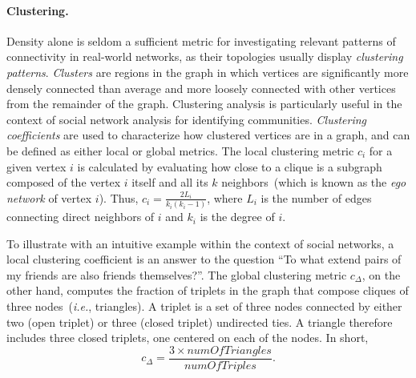 \paragraph*{Clustering.}
Density alone is seldom a sufficient metric for investigating relevant patterns of connectivity in real-world networks, as their topologies usually display \textit{clustering patterns}.
\textit{Clusters} are regions in the graph in which vertices are significantly more densely connected than average and more loosely connected with other vertices from the remainder of the graph. 
Clustering analysis is particularly useful in the context of social network analysis for identifying communities.
%
\textit{Clustering coefficients} are used to characterize how clustered vertices are in a graph, and can be defined as either local or global metrics.
The local clustering metric $c_i$ for a given vertex $i$ is calculated by evaluating how close to a clique is a subgraph composed of the vertex $i$ itself and all its $k$ neighbors~(which is known as the \textit{ego network} of vertex $i$). Thus, $c_i = \frac{2L_i}{k_i(k_i - 1)}$, where $L_i$ is the number of edges connecting direct neighbors of $i$ and $k_i$ is the degree of $i$.

To illustrate with an intuitive example within the context of social networks, a local clustering coefficient is an answer to the question ``To what extend pairs of my friends are also friends themselves?''.
%
The global clustering metric $c_{\Delta}$, on the other hand, computes the fraction of triplets in the graph that compose cliques of three nodes~(\textit{i.e.}, triangles). A triplet is a set of three nodes connected by either two (open triplet) or three (closed triplet) undirected ties. A triangle therefore includes three closed triplets, one centered on each of the nodes. In short, \begin{equation}\label{eq:globalclustering}
c_{\Delta} = \frac{3 \times numOfTriangles}{numOfTriples}.
\end{equation}



